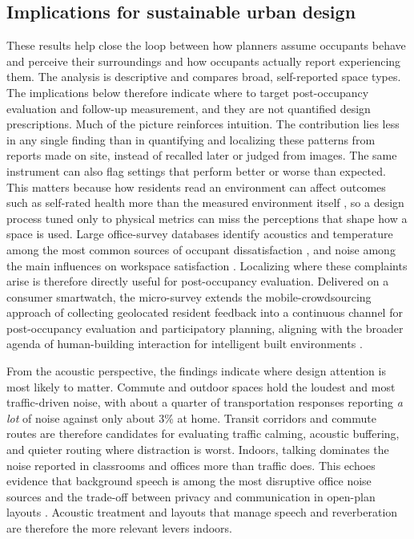 \documentclass[]{interact}
\begin{document}
\subsection{Implications for sustainable urban design}\label{sec:disc-implications}
These results help close the loop between how planners assume occupants behave and perceive their surroundings and how occupants actually report experiencing them.
The analysis is descriptive and compares broad, self-reported space types.
The implications below therefore indicate where to target post-occupancy evaluation and follow-up measurement, and they are not quantified design prescriptions.
Much of the picture reinforces intuition.
The contribution lies less in any single finding than in quantifying and localizing these patterns from reports made on site, instead of recalled later or judged from images.
The same instrument can also flag settings that perform better or worse than expected.
This matters because how residents read an environment can affect outcomes such as self-rated health more than the measured environment itself \citep{Kim2016-wx}, so a design process tuned only to physical metrics can miss the perceptions that shape how a space is used.
Large office-survey databases identify acoustics and temperature among the most common sources of occupant dissatisfaction \citep{Graham2021-en,Parkinson2023-yk}, and noise among the main influences on workspace satisfaction \citep{Frontczak2012-uh}.
Localizing where these complaints arise is therefore directly useful for post-occupancy evaluation.
Delivered on a consumer smartwatch, the micro-survey extends the mobile-crowdsourcing approach of collecting geolocated resident feedback \citep{Phuttharak2020-js} into a continuous channel for post-occupancy evaluation and participatory planning, aligning with the broader agenda of human-building interaction for intelligent built environments \citep{Becerik-Gerber2022-am}.

From the acoustic perspective, the findings indicate where design attention is most likely to matter.
Commute and outdoor spaces hold the loudest and most traffic-driven noise, with about a quarter of transportation responses reporting \emph{a lot} of noise against only about 3\% at home.
Transit corridors and commute routes are therefore candidates for evaluating traffic calming, acoustic buffering, and quieter routing where distraction is worst.
Indoors, talking dominates the noise reported in classrooms and offices more than traffic does.
This echoes evidence that background speech is among the most disruptive office noise sources \citep{Jahncke2016-il} and the trade-off between privacy and communication in open-plan layouts \citep{Kim2013-gs}.
Acoustic treatment and layouts that manage speech and reverberation are therefore the more relevant levers indoors.
\end{document}

